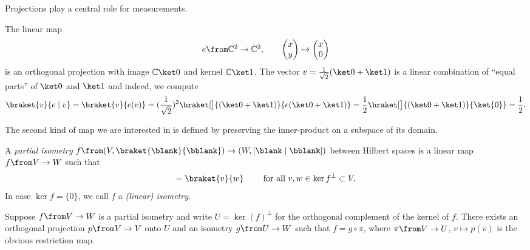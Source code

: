 \documentclass[a4paper,oneside, 12pt]{amsart}
\begin{document}
Projections play a central role for measurements.
\begin{example}\label{ex:proj-onto-0-ket}
  The linear map
  \begin{equation*}
    e \from \mathbb{C}^{2} \to \mathbb{C}^{2}, \qquad
    \begin{pmatrix}
      x \\ y
    \end{pmatrix}
    \mapsto
    \begin{pmatrix}
      x \\ 0
    \end{pmatrix}
  \end{equation*}
  is an orthogonal projection with image \( \mathbb{C} \ket 0\) and kernel \( \mathbb{C} \ket 1\).
  The vector \(v = \tfrac{1}{\sqrt{2}}(\ket 0 + \ket 1)\) is a linear combination  of ``equal parts'' of \(\ket 0\) and \(\ket 1\) and indeed, we compute
  \begin{equation*}
    \braket{v}{e \mid v}
    = \braket{v}{e(v)}
    = (\frac{1}{\sqrt{2}})^{2} \braket[\big]{(\ket 0 + \ket 1)}{e(\ket 0 + \ket 1)}
    = \frac{1}{2} \braket[\big]{(\ket 0 + \ket 1)}{\ket{0}}
    = \frac{1}{2}.
  \end{equation*}
\end{example}
\bigskip

The second kind of map we are interested in is defined by preserving the inner-product on a subspace of its domain.
\begin{definition}\label{def:partial-isometry}
  A \emph{partial isometry}  \(f \from (V, \braket{\blank}{\bblank})\to (W, [\blank \mid \bblank ])\) between Hilbert spaces is a linear map \(f \from V\to W\) such that
  \begin{equation}
    [f(v) \mid f(w) ] = \braket{v}{w} \qquad \text{ for all } v, w \in \ker f^{\perp}\subset V.
  \end{equation}
  In case \(\ker f =\{0\}\), we call \(f\) a \emph{(linear) isometry}.
\end{definition}

Suppose \( f \from V \to W \) is a partial isometry and write \(U = \ker(f)^\perp \) for the orthogonal complement of the kernel of \( f \).
There exists an orthogonal projection \( p \from V \to V \) onto \( U \) and an isometry \( g \from U \to W \) such that \( f = g \circ \pi \), where \( \pi \from V \to U \), \(v \mapsto p(v)\) is the obvious restriction map.
\end{document}

